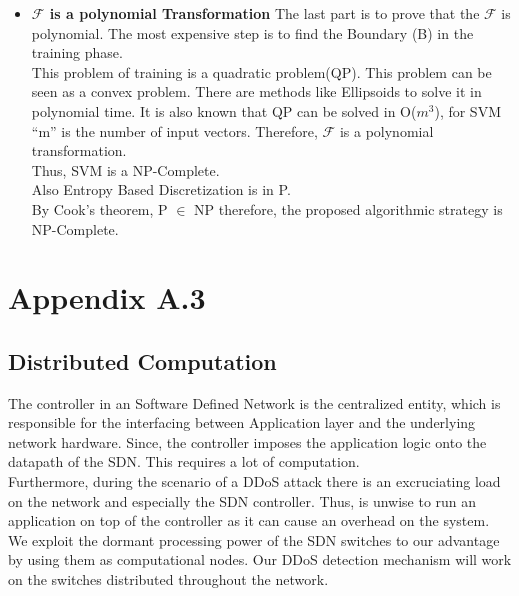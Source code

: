 \documentclass[12pt,a4paper,final]{report}
\DeclareRobustCommand{\gobblefive}[5]{}
\newcommand*{\SkipTocEntry}{\addtocontents{toc}{\gobblefive}}
\begin{document}
{{{{\begin{itemize}
\begin{equation}
\sum_{k \in A'}s(k) = B \leftrightarrow k^*(x_i,x_j) = \frac{1}{q^2}\sum_{k \in A'}k(x_i,x_j)
\end{equation}
This implies that the transformed subset problem is equivalent to SVM classification using an optimum kernel. Thus, for every instance of (\emph{I')} if the answer is "yes" the answer can be mapped for the instance  of (\emph{I}). \\
\item
\textbf{$\mathcal{F}$ is a polynomial Transformation}
\newline The last part is to prove that the $\mathcal{F}$ is polynomial. The most expensive step is to find the Boundary (B) in the training phase.\\
This problem of training is a quadratic problem(QP). This problem can be seen as a convex problem. There are methods like Ellipsoids to solve it in polynomial time. 
It is also known that QP can be solved in O($m^3$), for  SVM ``m'' is the number of input vectors. Therefore, $\mathcal{F}$ is a polynomial transformation. \\
\newline Thus, SVM is a NP-Complete.\\
Also Entropy Based Discretization is in P.\\
By Cook's theorem, P $\in$ NP therefore, the proposed algorithmic strategy is NP-Complete.  

\end{itemize}

\newpage
\SkipTocEntry\section{Appendix A.3}
\SkipTocEntry\subsection{Distributed Computation}
The controller in an Software Defined Network is the centralized entity, which is responsible for the interfacing between Application layer and the underlying network hardware. Since, the controller imposes the application logic onto the datapath of the SDN. This requires a lot of computation. \\

	Furthermore, during the scenario of a DDoS attack there is an excruciating load on the network and especially the SDN controller.	Thus, is unwise to run an application on top of the controller as it can cause an overhead on the system. We exploit the dormant processing power of the SDN switches to our advantage by using them as computational nodes. Our DDoS detection mechanism will work on the switches distributed throughout the network. \\

}}}}
\end{document}
